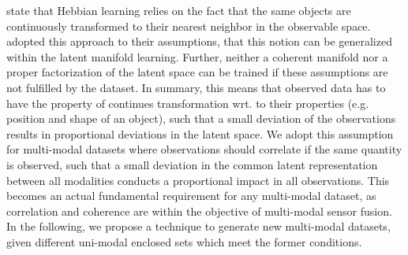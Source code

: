 \cite{Perry2010} state that Hebbian learning relies on the fact that the same objects are continuously transformed to their nearest neighbor in the observable space.
%
\cite{Higgins2016} adopted this approach to their assumptions, that this notion can be generalized within the latent manifold learning.
%
Further, neither a coherent manifold nor a proper factorization of the latent space can be trained if these assumptions are not fulfilled by the dataset.
%
In summary, this means that observed data has to have the property of continues transformation wrt. to their properties (e.g. position and shape of an object), such that a small deviation of the observations results in proportional deviations in the latent space.
%
%
We adopt this assumption for multi-modal datasets where observations should correlate if the same quantity is observed, such that a small deviation in the common latent representation between all modalities conducts a proportional impact in all observations.
%
This becomes an actual fundamental requirement for any multi-modal dataset, as correlation and coherence are within the objective of multi-modal sensor fusion.
%
%
%
%
%
%
%
%
%
%
%
%
In the following, we propose a technique to generate new multi-modal datasets, given different uni-modal enclosed sets which meet the former conditions.

